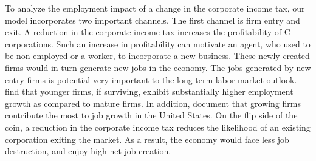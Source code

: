 \documentclass[12pt]{article}
\begin{document}
To analyze the employment impact of a change in the corporate income tax, our model incorporates two important channels. The first channel is firm entry and exit. A reduction in the corporate income tax increases the profitability of C corporations. Such an increase in profitability can motivate an agent, who used to be non-employed or a worker, to incorporate a new business. These newly created firms would in turn generate new jobs in the economy. The jobs generated by new entry firms is potential very important to the long term labor market outlook. \citet{Haltiwanger2013} find that younger firms, if surviving, exhibit substantially higher employment growth as compared to
mature firms. In addition, \citet{Haltiwanger2013} document that growing firms contribute the most to job growth in the United
States. On the flip side of the coin, a reduction in the corporate income tax reduces the likelihood of an existing corporation exiting the market. As a result, the economy would face less job destruction, and enjoy high net job creation.
\end{document}
